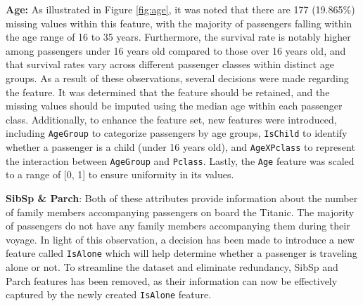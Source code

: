 \documentclass[10pt]{article}
\begin{document}
\textbf{Age:} As illustrated in Figure \ref{fig:age}, it was noted that there are 177 (19.865\%) missing values within this feature, with the majority of passengers falling within the age range of 16 to 35 years. 
Furthermore, the survival rate is notably higher among passengers under 16 years old compared to those over 16 years old, and that survival rates vary across different passenger classes within distinct age groups. 
As a result of these observations, several decisions were made regarding the feature. It was determined that the feature should be retained, and the missing values should be imputed using the median age within each passenger class. 
Additionally, to enhance the feature set, new features were introduced, including \texttt{AgeGroup} 
to categorize passengers by age groups, \texttt{IsChild} to identify whether a passenger is a child (under 16 years old), and \texttt{AgeXPclass} to represent the interaction between \texttt{AgeGroup} and \texttt{Pclass}. 
Lastly, the \texttt{Age} feature was scaled to a range of [0, 1] to ensure uniformity in its values.

\textbf{SibSp \& Parch}: Both of these attributes provide information about the number of family members accompanying passengers on board the Titanic. 
The majority of passengers do not have any family members accompanying them during their voyage. 
In light of this observation, a decision has been made to introduce a new feature called \texttt{IsAlone} which will help determine whether a passenger is traveling alone or not. 
To streamline the dataset and eliminate redundancy, SibSp and Parch features has been removed, as their information can now be effectively captured by the newly created \texttt{IsAlone} feature.
\end{document}
